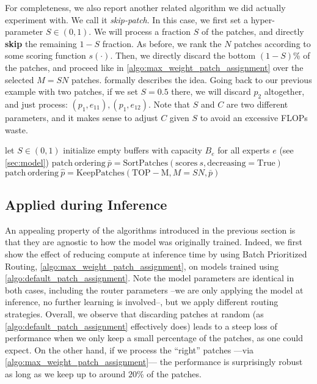 \documentclass{article}
\newcommand{\maxrouting}{Batch Prioritized Routing}
\begin{document}
For completeness, we also report another related algorithm we did actually experiment with.
We call it \emph{skip-patch}.
In this case, we first set a hyper-parameter $S \in (0, 1)$.
We will process a fraction $S$ of the patches, and directly \textbf{skip} the remaining $1-S$ fraction.
As before, we rank the $N$ patches according to some scoring function $s(\cdot)$.
Then, we directly discard the bottom $(1-S)$\% of the patches, and proceed like in \cref{algo:max_weight_patch_assignment} over the selected $M=SN$ patches.
 formally describes the idea.
Going back to our previous example with two patches, if we set $S=0.5$ there, we will discard $p_2$ altogether, and just process: $(p_1, e_{11}), (p_1, e_{12})$.
Note that $S$ and $C$ are two different parameters, and it makes sense to adjust $C$ given $S$ to avoid an excessive FLOPs waste.

\begin{algorithm}[H]
\SetAlgoLined
{}
 let $S \in (0, 1)$\;
 initialize empty buffers with capacity $B_e$ for all experts $e$ (see \cref{sec:model})\;
 $ \mathrm{patch} \ \mathrm{ordering} \ \bar{p} = \mathrm{SortPatches}(\mathrm{scores} \ s, \mathrm{decreasing = True}) $\;
 $ \mathrm{patch} \ \mathrm{ordering} \ \hat{p} = \mathrm{KeepPatches}(\mathrm{TOP-M}, M = SN, \bar{p}) $\;
 \caption{Skip-Patch Routing Allocation}
 \label{algo:skip_patch_assignment}
\end{algorithm}



\subsection{Applied during Inference}

An appealing property of the algorithms introduced in the previous section is that they are agnostic to how the model was originally trained.
Indeed, we first show the effect of reducing compute at inference time by using \maxrouting{}, \cref{algo:max_weight_patch_assignment}, on models trained using \cref{algo:default_patch_assignment}.
Note the model parameters are identical in both cases, including the router parameters --we are only applying the model at inference, no further learning is involved--, but we apply different routing strategies.
Overall, we observe that discarding patches at random (as \cref{algo:default_patch_assignment} effectively does) leads to a steep loss of performance when we only keep a small percentage of the patches, as one could expect.
On the other hand, if we process the ``right'' patches ---via \cref{algo:max_weight_patch_assignment}--- the performance is surprisingly robust as long as we keep up to around $20$\% of the patches.
\end{document}
